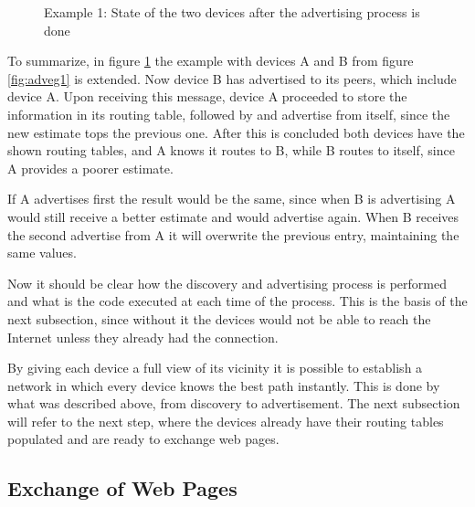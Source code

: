 \begin{figure}[ht]
   \noindent{}
	\caption{\label{fig:adveg2} Example 1: State of the two devices after the advertising process is done} 
\end{figure}

To summarize, in figure \ref{fig:adveg2} the example with devices A and B from figure \ref{fig:adveg1} is extended. Now device B has advertised to its peers, which include device A. Upon receiving this message, device A proceeded to store the information in its routing table, followed by and advertise from itself, since the new estimate tops the previous one. After this is concluded both devices have the shown routing tables, and A knows it routes to B, while B routes to itself, since A provides a poorer estimate.

If A advertises first the result would be the same, since when B is advertising A would still receive a better estimate and would advertise again. When B receives the second advertise from A it will overwrite the previous entry, maintaining the same values.

Now it should be clear how the discovery and advertising process is performed and what is the code executed at each time of the process. This is the basis of the next subsection, since without it the devices would not be able to reach the Internet unless they already had the connection.

By giving each device a full view of its vicinity it is possible to establish a network in which every device knows the best path instantly. This is done by what was described above, from discovery to advertisement. The next subsection will refer to the next step, where the devices already have their routing tables populated and are ready to exchange web pages. 

\subsection{Exchange of Web Pages}

